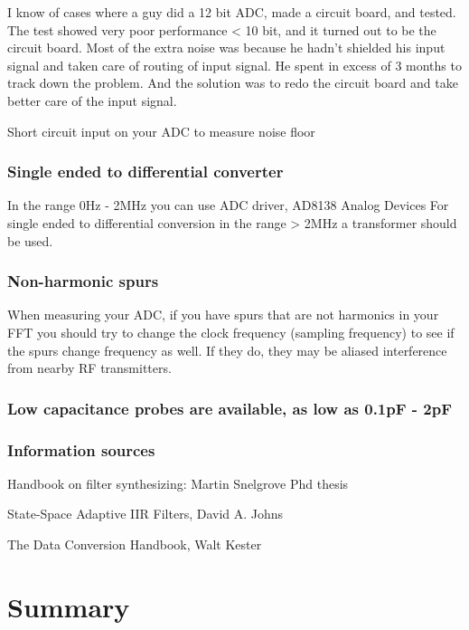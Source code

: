 I know of cases where a guy did a 12 bit ADC, made a circuit board, and
tested. The test showed very poor performance \textless{} 10 bit, and it
turned out to be the circuit board. Most of the extra noise was because
he hadn't shielded his input signal and taken care of routing of input
signal. He spent in excess of 3 months to track down the problem. And
the solution was to redo the circuit board and take better care of the
input signal.

Short circuit input on your ADC to measure noise floor

\subsubsection{Single ended to differential
converter}\label{single-ended-to-differential-converter}

In the range 0Hz - 2MHz you can use ADC driver, AD8138 Analog Devices
For single ended to differential conversion in the range \textgreater{}
2MHz a transformer should be used.

\subsubsection{Non-harmonic spurs}\label{non-harmonic-spurs}

When measuring your ADC, if you have spurs that are not harmonics in
your FFT you should try to change the clock frequency (sampling
frequency) to see if the spurs change frequency as well. If they do,
they may be aliased interference from nearby RF transmitters.

\subsubsection{Low capacitance probes are available, as low as 0.1pF -
2pF}\label{low-capacitance-probes-are-available-as-low-as-0.1pf---2pf}

\subsubsection{Information sources}\label{information-sources}

Handbook on filter synthesizing: Martin Snelgrove Phd thesis

State-Space Adaptive IIR Filters, David A. Johns

The Data Conversion Handbook, Walt Kester

\section{Summary}\label{summary}

